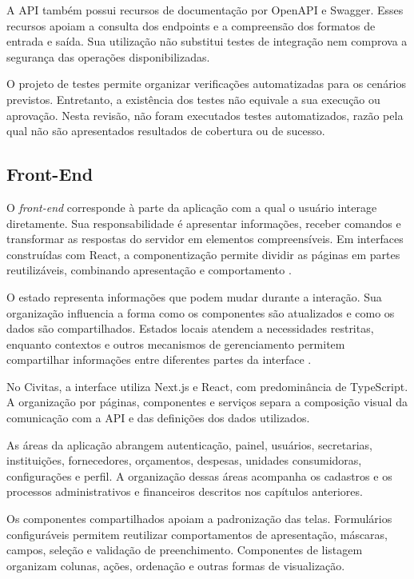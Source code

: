 A API também possui recursos de documentação por OpenAPI e Swagger. Esses recursos apoiam a consulta dos endpoints e a compreensão dos formatos de entrada e saída. Sua utilização não substitui testes de integração nem comprova a segurança das operações disponibilizadas.

O projeto de testes permite organizar verificações automatizadas para os cenários previstos. Entretanto, a existência dos testes não equivale a sua execução ou aprovação. Nesta revisão, não foram executados testes automatizados, razão pela qual não são apresentados resultados de cobertura ou de sucesso.

\subsection{Front-End}
\label{subsec:cap6-front-end}

O \textit{front-end} corresponde à parte da aplicação com a qual o usuário interage diretamente. Sua responsabilidade é apresentar informações, receber comandos e transformar as respostas do servidor em elementos compreensíveis. Em interfaces construídas com React, a componentização permite dividir as páginas em partes reutilizáveis, combinando apresentação e comportamento \parencite{ReactComponents}.

O estado representa informações que podem mudar durante a interação. Sua organização influencia a forma como os componentes são atualizados e como os dados são compartilhados. Estados locais atendem a necessidades restritas, enquanto contextos e outros mecanismos de gerenciamento permitem compartilhar informações entre diferentes partes da interface \parencite{ReactManagingState}.

No Civitas, a interface utiliza Next.js e React, com predominância de TypeScript. A organização por páginas, componentes e serviços separa a composição visual da comunicação com a API e das definições dos dados utilizados.

As áreas da aplicação abrangem autenticação, painel, usuários, secretarias, instituições, fornecedores, orçamentos, despesas, unidades consumidoras, configurações e perfil. A organização dessas áreas acompanha os cadastros e os processos administrativos e financeiros descritos nos capítulos anteriores.

Os componentes compartilhados apoiam a padronização das telas. Formulários configuráveis permitem reutilizar comportamentos de apresentação, máscaras, campos, seleção e validação de preenchimento. Componentes de listagem organizam colunas, ações, ordenação e outras formas de visualização.

